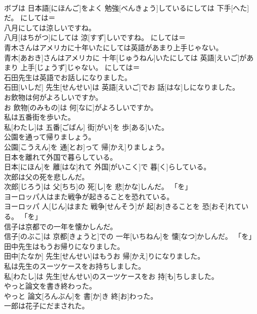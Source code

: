 \documentclass[8pt]{extreport}
\begin{document}
\begin{CJK}{UTF8}{min}
\\	ボブは 日本語[にほんご]をよく 勉強[べんきょう]しているにしては 下手[へた]だ。	にしては＝ 
\\	八月にしては涼しいですね。	
\\	八月[はちがつ]にしては 涼[すず]しいですね。	にしては＝ 
\\	青木さんはアメリカに十年いたにしては英語があまり上手じゃない。	
\\	青木[あおき]さんはアメリカに 十年[じゅうねん]いたにしては 英語[えいご]があまり 上手[じょうず]じゃない。	にしては＝ 
\\	石田先生は英語でお話しになりました。	
\\	石田[いしだ] 先生[せんせい]は 英語[えいご]でお 話[はな]しになりました。	
\\	お飲物は何がよろしいですか。	
\\	お 飲物[のみもの]は 何[なに]がよろしいですか。	
\\	私は五番街を歩いた。	
\\	私[わたし]は 五番[ごばん] 街[がい]を 歩[ある]いた。	
\\	公園を通って帰りましょう。	
\\	公園[こうえん]を 通[とお]って 帰[かえ]りましょう。	
\\	日本を離れて外国で暮らしている。	
\\	日本[にほん]を 離[はな]れて 外国[がいこく]で 暮[く]らしている。	
\\	次郎は父の死を悲しんだ。	
\\	次郎[じろう]は 父[ちち]の 死[し]を 悲[かな]しんだ。	「を」
\\	ヨーロッパ人はまた戦争が起きることを恐れている。	
\\	ヨーロッパ 人[じん]はまた 戦争[せんそう]が 起[お]きることを 恐[おそ]れている。	「を」
\\	信子は京都での一年を懐かしんだ。	
\\	信子[のぶこ]は 京都[きょうと]での 一年[いちねん]を 懐[なつ]かしんだ。	「を」
\\	田中先生はもうお帰りになりました。	
\\	田中[たなか] 先生[せんせい]はもうお 帰[かえ]りになりました。	
\\	私は先生のスーツケースをお持ちしました。	
\\	私[わたし]は 先生[せんせい]のスーツケースをお 持[も]ちしました。	
\\	やっと論文を書き終わった。	
\\	やっと 論文[ろんぶん]を 書[か]き 終[お]わった。	
\\	一郎は花子にだまされた。	

\end{CJK}
\end{document}
